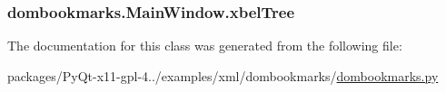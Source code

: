 \subsubsection[{xbel\+Tree}]{\setlength{\rightskip}{0pt plus 5cm}dombookmarks.\+Main\+Window.\+xbel\+Tree}\label{classdombookmarks_1_1MainWindow_a6872624cee3e5fd8ea21746c03d615d6}


The documentation for this class was generated from the following file\+:\begin{DoxyCompactItemize}
\item 
packages/\+Py\+Qt-\/x11-\/gpl-\/4../examples/xml/dombookmarks/\hyperlink{dombookmarks_8py}{dombookmarks.\+py}\end{DoxyCompactItemize}
